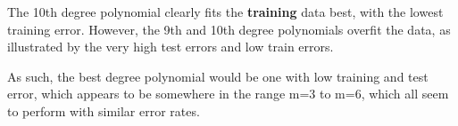 \documentclass[11pt]{article}
\begin{document}
\begin{enumerate}
The 10th degree polynomial clearly fits the \textbf{training} data best, with the lowest training error. However, the 9th and 10th degree polynomials overfit the data, as illustrated by the very high test errors and low train errors. 

As such, the best degree polynomial would be one with low training and test error, which appears to be somewhere in the range m=3 to m=6, which all seem to perform with similar error rates.

\end{enumerate}
\end{document}
